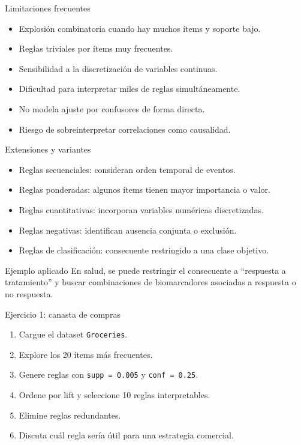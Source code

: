 \documentclass[10pt,aspectratio=169]{beamer}
\begin{document}
\begin{frame}{Limitaciones frecuentes}
\begin{itemize}
  \item Explosión combinatoria cuando hay muchos ítems y soporte bajo.
  \item Reglas triviales por ítems muy frecuentes.
  \item Sensibilidad a la discretización de variables continuas.
  \item Dificultad para interpretar miles de reglas simultáneamente.
  \item No modela ajuste por confusores de forma directa.
  \item Riesgo de sobreinterpretar correlaciones como causalidad.
\end{itemize}
\end{frame}

\begin{frame}{Extensiones y variantes}
\begin{itemize}
  \item Reglas secuenciales: consideran orden temporal de eventos.
  \item Reglas ponderadas: algunos ítems tienen mayor importancia o valor.
  \item Reglas cuantitativas: incorporan variables numéricas discretizadas.
  \item Reglas negativas: identifican ausencia conjunta o exclusión.
  \item Reglas de clasificación: consecuente restringido a una clase objetivo.
\end{itemize}

\begin{exampleblock}{Ejemplo aplicado}
En salud, se puede restringir el consecuente a ``respuesta a tratamiento'' y buscar combinaciones de biomarcadores asociadas a respuesta o no respuesta.
\end{exampleblock}
\end{frame}

\begin{frame}{Ejercicio 1: canasta de compras}
\begin{enumerate}
  \item Cargue el dataset \texttt{Groceries}.
  \item Explore los 20 ítems más frecuentes.
  \item Genere reglas con \texttt{supp = 0.005} y \texttt{conf = 0.25}.
  \item Ordene por lift y seleccione 10 reglas interpretables.
  \item Elimine reglas redundantes.
  \item Discuta cuál regla sería útil para una estrategia comercial.
\end{enumerate}
\end{frame}
\end{document}
